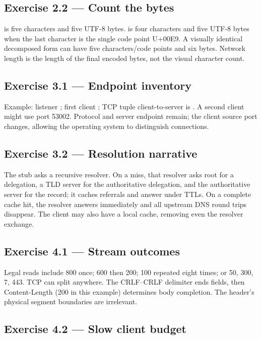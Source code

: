 \subsection*{Exercise 2.2 --- Count the bytes}

 is five characters and five UTF-8 bytes.  is four
characters and five UTF-8 bytes when the last character is the single code point
U+00E9. A visually identical decomposed form can have five characters/code points
and six bytes. Network length is the length of the final encoded bytes, not the
visual character count.

\subsection*{Exercise 3.1 --- Endpoint inventory}

Example: listener ; first client
; TCP tuple client-to-server is
. A second client might use port 53002.
Protocol and server endpoint remain; the client source port changes, allowing the
operating system to distinguish connections.

\subsection*{Exercise 3.2 --- Resolution narrative}

The stub asks a recursive resolver. On a miss, that resolver asks root for a
delegation, a TLD server for the authoritative delegation, and the authoritative
server for the record; it caches referrals and answer under TTLs. On a complete
cache hit, the resolver answers immediately and all upstream DNS round trips
disappear. The client may also have a local cache, removing even the resolver
exchange.

\subsection*{Exercise 4.1 --- Stream outcomes}

Legal reads include 800 once; 600 then 200; 100 repeated eight times; or 50,
300, 7, 443. TCP can split anywhere. The CRLF--CRLF delimiter ends fields, then
Content-Length (200 in this example) determines body completion. The header's
physical segment boundaries are irrelevant.

\subsection*{Exercise 4.2 --- Slow client budget}

